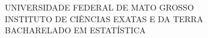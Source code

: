 \begin{capa}
\center\large
UNIVERSIDADE FEDERAL DE MATO GROSSO\\
INSTITUTO DE CIÊNCIAS EXATAS E DA TERRA\\
BACHARELADO EM ESTATÍSTICA

\vfill

\imprimirautor
\vfill

\textbf{\imprimirtitulo}

\vfill

\imprimirlocal\\
\imprimirdata

\vspace*{1cm}
\end{capa}


